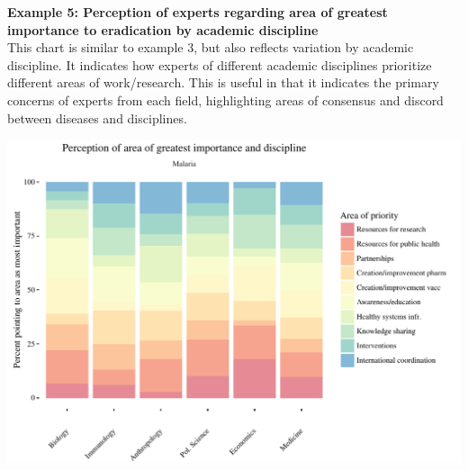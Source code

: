 \documentclass{article}
\begin{document}
\newpage
\noindent \textbf{Example 5: Perception of experts regarding area of greatest importance to eradication by academic discipline} \\
\noindent This chart is similar to example 3, but also reflects variation by academic discipline. It indicates how experts of different academic disciplines prioritize different areas of work/research. This is useful in that it indicates the primary concerns of experts from each field, highlighting areas of consensus and discord between diseases and disciplines.

\begin{center}
\includegraphics{chart5.pdf}
\end{center}

\newpage

{}
  
\end{document}
